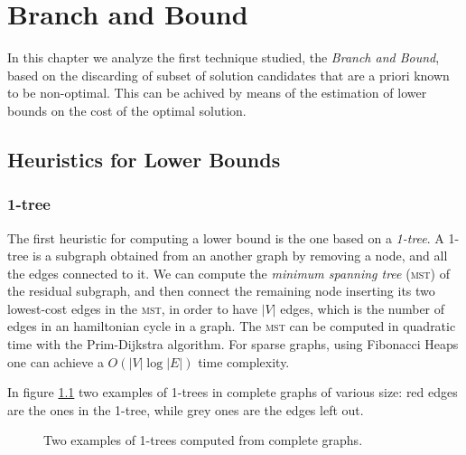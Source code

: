 \chapter{Branch and Bound}
In this chapter we analyze the first technique studied, the \textit{Branch and Bound}, based on the discarding of subset of solution candidates that are a priori known to be non-optimal. This can be achived by means of the estimation of lower bounds on the cost of the optimal solution.

\section{Heuristics for Lower Bounds}
\subsection{1-tree}
The first heuristic for computing a lower bound is the one based on a \textit{1-tree}. A 1-tree is a subgraph obtained from an another graph by removing a node, and all the edges connected to it. We can compute the \textit{minimum spanning tree} (\textsc{mst}) of the residual subgraph, and then connect the remaining node inserting its two lowest-cost edges in the \textsc{mst}, in order to have $|V|$ edges, which is the number of edges in an hamiltonian cycle in a graph. The \textsc{mst} can be computed in quadratic time with the Prim-Dijkstra algorithm. For sparse graphs, using Fibonacci Heaps one can achieve a $O(|V|\log|E|)$ time complexity.

In figure \ref{fig:1trees} two examples of 1-trees in complete graphs of various size: red edges are the ones in the 1-tree, while grey ones are the edges left out.

\begin{figure}[hbtp]
  \centering
   \quad
  \caption{Two examples of 1-trees computed from complete graphs.}
  \label{fig:1trees}
\end{figure}

